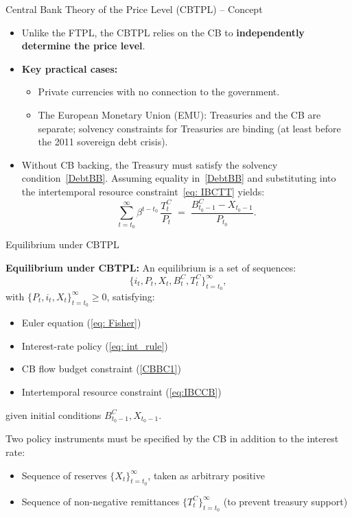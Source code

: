 \documentclass[11pt,aspectratio=169]{beamer}
\begin{document}
\begin{frame}{Central Bank Theory of the Price Level (CBTPL) – Concept}

\begin{itemize}

  \item Unlike the FTPL, the CBTPL relies on the CB to \textbf{independently determine the price level}.

  \vspace{0.25cm}
  \item \textbf{Key practical cases:}
  \begin{itemize}
    \item Private currencies with no connection to the government.
    \item The European Monetary Union (EMU): Treasuries and the CB are separate; 
    solvency constraints for Treasuries are binding (at least before the 2011 sovereign debt crisis).
  \end{itemize}

  \vspace{0.25cm}
  \item Without CB backing, the Treasury must satisfy the solvency condition~\eqref{DebtBB}.  
  Assuming equality in~\eqref{DebtBB} and substituting into the intertemporal resource constraint~\eqref{eq: IBCTT} yields:
  \begin{equation}
    \sum_{t=t_{0}}^{\infty} \beta^{t-t_{0}}\,\frac{T_t^C}{P_t}
    \;=\;
    \frac{B_{t_0-1}^C - X_{t_0-1}}{P_{t_0}}.
    \label{eq:IBCCB}
  \end{equation}

\end{itemize}
\end{frame}

\begin{frame}{Equilibrium under CBTPL}

\textbf{Equilibrium under CBTPL:}  
An equilibrium is a set of sequences:
\[
\{ i_t, P_t, X_t, B_t^C, T_t^C \}_{t=t_0}^\infty,
\]
with $\{P_t, i_t, X_t \}_{t=t_0}^\infty \geq 0$, satisfying:
\begin{itemize}
  \item Euler equation (\ref{eq: Fisher})
  \item Interest-rate policy (\ref{eq: int_rule})
  \item CB flow budget constraint (\ref{CBBC1})
  \item Intertemporal resource constraint (\ref{eq:IBCCB})
\end{itemize}

given initial conditions $B_{t_0-1}^C, X_{t_0-1}$.  
\break

Two policy instruments must be specified by the CB in addition to the interest rate:
\begin{itemize}
  \item Sequence of reserves $\{X_t\}_{t=t_0}^\infty$, taken as arbitrary positive
  \item Sequence of non-negative remittances $\{T_t^C\}_{t=t_0}^\infty$ (to prevent treasury support)
\end{itemize}

\end{frame}
\end{document}
